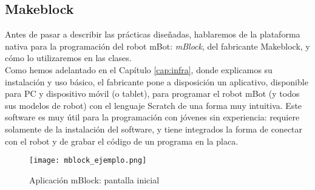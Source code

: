 \subsection{Makeblock}\label{subsec:makeblock}
Antes de pasar a describir las prácticas diseñadas, hablaremos de la plataforma nativa para la programación del robot mBot: \textit{mBlock}, del fabricante Makeblock\cite{makeblock}, y cómo lo utilizaremos en las clases. \\
Como hemos adelantado en el Capítulo \ref{cap:infra}, donde explicamos su instalación y uso básico, el fabricante pone a disposición un aplicativo, disponible para PC y dispositivo móvil (o tablet), para programar el robot mBot (y todos sus modelos de robot) con el lenguaje Scratch de una forma muy intuitiva. Este software es muy útil para la programación con jóvenes sin experiencia: requiere solamente de la instalación del software, y tiene integrados la forma de conectar con el robot y de grabar el código de un programa en la placa.\\
\begin{figure}[h]
	\centering
	\texttt{[image: mblock\_ejemplo.png]}
	\label{img:pantallamblock}
	\caption{Aplicación mBlock: pantalla inicial}
\end{figure}

